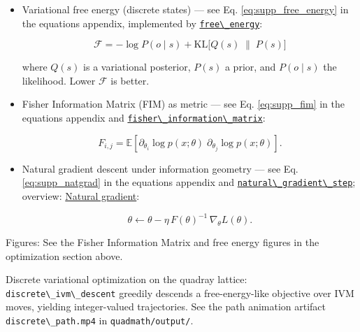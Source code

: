 \documentclass[
  10pt,
]{article}
\newcommand{\passthrough}[1]{#1}
\begin{document}
\begin{itemize}
\item
  Variational free energy (discrete states) --- see Eq.
  \eqref{eq:supp_free_energy} in the equations appendix, implemented by
  \href{08_equations_appendix.md\#code:free_energy}{\passthrough{\lstinline!free\_energy!}}:

  \begin{equation}\label{eq:free_energy_appendix_ref}
  \mathcal{F} = -\log P(o\mid s) + \mathrm{KL}\big[ Q(s)\;\|\; P(s) \big]
  \end{equation}

  where \(Q(s)\) is a variational posterior, \(P(s)\) a prior, and
  \(P(o\mid s)\) the likelihood. Lower \(\mathcal{F}\) is better.
\item
  Fisher Information Matrix (FIM) as metric --- see Eq.
  \eqref{eq:supp_fim} in the equations appendix and
  \href{08_equations_appendix.md\#code:fisher_information_matrix}{\passthrough{\lstinline!fisher\_information\_matrix!}}:

  \begin{equation}\label{eq:fim_definition}
  F_{i,j} = \mathbb{E}\left[ \partial_{\theta_i} \log p(x;\theta)\; \partial_{\theta_j} \log p(x;\theta) \right].
  \end{equation}
\item
  Natural gradient descent under information geometry --- see Eq.
  \eqref{eq:supp_natgrad} in the equations appendix and
  \href{08_equations_appendix.md\#code:natural_gradient_step}{\passthrough{\lstinline!natural\_gradient\_step!}};
  overview:
  \href{https://en.wikipedia.org/wiki/Natural_gradient}{Natural
  gradient}:

  \begin{equation}\label{eq:natural_gradient_update}
  \theta \leftarrow \theta - \eta\, F(\theta)^{-1}\, \nabla_{\theta} L(\theta).
  \end{equation}
\end{itemize}

Figures: See the Fisher Information Matrix and free energy figures in
the optimization section above.

Discrete variational optimization on the quadray lattice:
\passthrough{\lstinline!discrete\_ivm\_descent!} greedily descends a
free-energy-like objective over IVM moves, yielding integer-valued
trajectories. See the path animation artifact
\passthrough{\lstinline!discrete\_path.mp4!} in
\passthrough{\lstinline!quadmath/output/!}.
\end{document}
